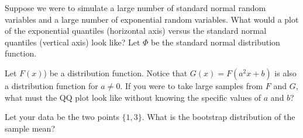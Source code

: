 \documentclass{homework}
\begin{document}
\begin{tcolorbox}[title=Question 9]
Suppose we were to simulate a large number of standard normal random variables and a large number of exponential random variables. What would a plot of the exponential quantiles (horizontal axis) versus the standard normal quantiles (vertical axis) look like? Let $\Phi$ be the standard normal distribution function.
\end{tcolorbox}

\begin{tcolorbox}[title=Question 10]
Let $F(x)$) be a distribution function. Notice that $G(x) = F(a^2x + b)$ is also a distribution function for $a \neq 0$. If you were to take large samples from $F$ and $G$, what must the QQ plot look like without knowing the specific values of $a$ and $b$?
\end{tcolorbox}

\begin{tcolorbox}[title=Question 11]
Let your data be the two points $\{1, 3\}$.  What is the bootstrap distribution of the sample mean?
\end{tcolorbox}
\end{document}
